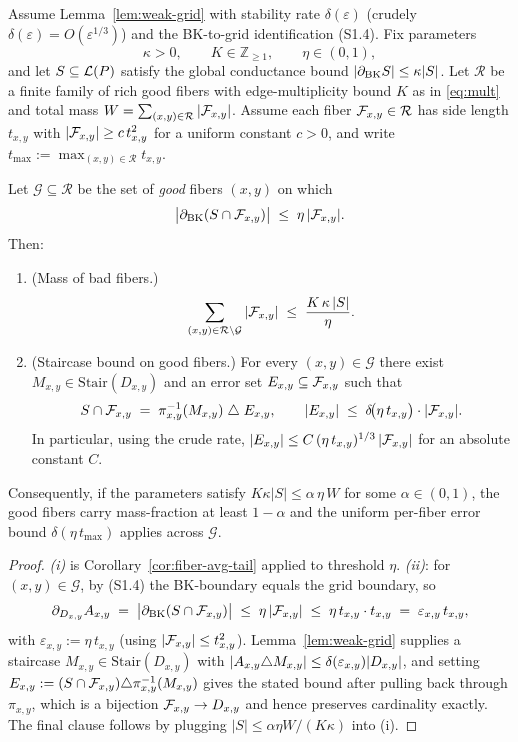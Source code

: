 \begin{proposition}\label{prop:per-fiber}
Assume Lemma~\ref{lem:weak-grid} with stability rate $\delta(\varepsilon)$
(crudely $\delta(\varepsilon)=O(\varepsilon^{1/3})$) and the BK-to-grid
identification (S1.4). Fix parameters
\[
\kappa>0,\qquad K\in\mathbb{Z}_{\ge 1},\qquad \eta\in(0,1),
\]
and let $S\subseteq\mathcal{L}(P)$ satisfy the global conductance bound
$|\partial_{\mathrm{BK}} S|\le\kappa|S|$. Let $\mathcal{R}$ be a finite family of
rich good fibers with edge-multiplicity bound $K$ as in \eqref{eq:mult} and
total mass $W=\sum_{(x,y)\in\mathcal{R}}|\mathcal{F}_{x,y}|$. Assume each fiber
$\mathcal{F}_{x,y}\in\mathcal{R}$ has side length $t_{x,y}$ with
$|\mathcal{F}_{x,y}|\ge c\,t_{x,y}^2$ for a uniform constant $c>0$, and write
$t_{\max}:=\max_{(x,y)\in\mathcal{R}} t_{x,y}$.

Let $\mathcal{G}\subseteq\mathcal{R}$ be the set of \emph{good} fibers
$(x,y)$ on which
\[
\bigl|\partial_{\mathrm{BK}}(S\cap\mathcal{F}_{x,y})\bigr|\;\le\;\eta\,|\mathcal{F}_{x,y}|.
\]
Then:
\begin{enumerate}[label=\textup{(\roman*)},nosep]
\item \textup{(Mass of bad fibers.)}
\[
\sum_{(x,y)\in\mathcal{R}\setminus\mathcal{G}}|\mathcal{F}_{x,y}|
  \;\le\;\frac{K\,\kappa\,|S|}{\eta}.
\]
\item \textup{(Staircase bound on good fibers.)} For every
$(x,y)\in\mathcal{G}$ there exist
$M_{x,y}\in\mathrm{Stair}(D_{x,y})$ and an error set
$E_{x,y}\subseteq\mathcal{F}_{x,y}$ such that
\[
S\cap\mathcal{F}_{x,y}
  \;=\;
  \pi_{x,y}^{-1}(M_{x,y})\;\triangle\;E_{x,y},
\qquad
|E_{x,y}|\;\le\;\delta\!\bigl(\eta\,t_{x,y}\bigr)\cdot|\mathcal{F}_{x,y}|.
\]
In particular, using the crude rate,
$|E_{x,y}|\le C\,(\eta\,t_{x,y})^{1/3}\,|\mathcal{F}_{x,y}|$ for an absolute
constant $C$.
\end{enumerate}
Consequently, if the parameters satisfy $K\kappa|S|\le\alpha\,\eta\,W$ for some
$\alpha\in(0,1)$, the good fibers carry mass-fraction at least $1-\alpha$ and
the uniform per-fiber error bound $\delta(\eta\,t_{\max})$ applies across
$\mathcal{G}$.
\end{proposition}

\begin{proof}[Proof]
\emph{(i)} is Corollary~\ref{cor:fiber-avg-tail} applied to threshold $\eta$.
\emph{(ii)}: for $(x,y)\in\mathcal{G}$, by (S1.4) the BK-boundary equals the
grid boundary, so
\[
\partial_{D_{x,y}} A_{x,y}
  \;=\;\bigl|\partial_{\mathrm{BK}}(S\cap\mathcal{F}_{x,y})\bigr|
  \;\le\;\eta\,|\mathcal{F}_{x,y}|
  \;\le\;\eta\,t_{x,y}\cdot t_{x,y}
  \;=\;\varepsilon_{x,y}\,t_{x,y},
\]
with $\varepsilon_{x,y}:=\eta\,t_{x,y}$ (using $|\mathcal{F}_{x,y}|\le t_{x,y}^2$).
Lemma~\ref{lem:weak-grid} supplies a staircase
$M_{x,y}\in\mathrm{Stair}(D_{x,y})$ with $|A_{x,y}\triangle
M_{x,y}|\le\delta(\varepsilon_{x,y})|D_{x,y}|$, and setting
$E_{x,y}:=(S\cap\mathcal{F}_{x,y})\triangle\pi_{x,y}^{-1}(M_{x,y})$ gives the stated
bound after pulling back through $\pi_{x,y}$, which is a bijection
$\mathcal{F}_{x,y}\to D_{x,y}$ and hence preserves cardinality exactly. The final
clause follows by plugging $|S|\le\alpha\eta W/(K\kappa)$ into (i).
\end{proof}

